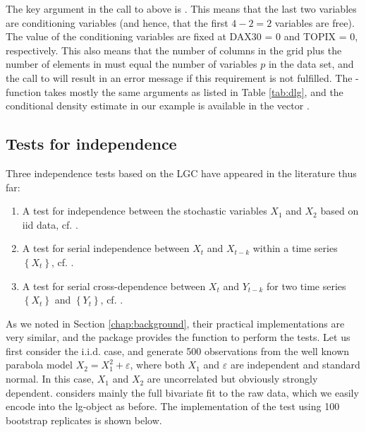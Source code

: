 The key argument in the call to  above is . This means that the last two variables are conditioning variables (and hence, that the first \(4-2=2\) variables are free). The value of the conditioning variables are fixed at DAX30 = 0 and TOPIX = 0, respectively. This also means that the number of columns in the grid  plus the number of elements in  must equal the number of variables \(p\) in the data set, and the call to  will result in an error message if this requirement is not fulfilled. The -function takes mostly the same arguments as  listed in Table \ref{tab:dlg}, and the conditional density estimate in our example is available in the vector .

\subsection{Tests for independence}
\label{chap:indtests}

Three independence tests based on the LGC have appeared in the literature thus far:

\begin{enumerate}
\def\labelenumi{\arabic{enumi}.}
\item
  A test for independence between the stochastic variables \(X_1\) and \(X_2\) based on iid data, cf. \citet{bere:tjos:2014}.
\item
  A test for serial independence between \(X_t\) and \(X_{t-k}\) within a time series \(\left\{X_t\right\}\), cf. \citet{laca:tjos:2017}. 
\item
  A test for serial cross-dependence between \(X_t\) and \(Y_{t-k}\) for two time series \(\left\{X_t\right\}\) and \(\left\{Y_t\right\}\), cf. \citet{laca:tjos:2018}.
\end{enumerate}
As we noted in Section \ref{chap:background}, their practical implementations are very similar, and the  package provides the function  to perform the tests. Let us first consider the i.i.d. case, and generate 500 observations  from the well known parabola model \(X_2 = X_1^2 + \varepsilon\), where both \(X_1\) and \(\varepsilon\) are independent and standard normal. In this case, \(X_1\) and \(X_2\) are uncorrelated but obviously strongly dependent. \citet{bere:tjos:2014} considers mainly the full bivariate fit to the raw data, which we easily encode into the lg-object as before. The implementation of the test using 100 bootstrap replicates is shown below.

